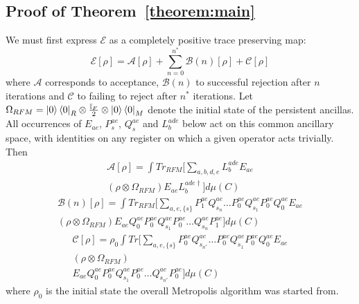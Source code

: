 \documentclass[aps,floatfix,10pt,amssymb,amsfont,amsmath,superscriptaddress,float,nofootinbib,longbibliography,nobalancelastpage,twocolumn]{revtex4-2}
\begin{document}
\subsection{Proof of Theorem~\ref{theorem:main}}
\label{section:proofmain}
We must first express $\mathcal{E}$ as a completely positive trace preserving map:
\begin{equation}
    \mathcal{E}[\rho] = \mathcal{A}[\rho] + \sum_{n=0}^{n^*} \mathcal{B}(n)[\rho] + \mathcal{C}[\rho]
\end{equation}
where $\mathcal{A}$ corresponds to acceptance, $\mathcal{B}(n)$ to successful rejection after $n$ iterations and $\mathcal{C}$ to failing to reject after $n^*$ iterations. Let $\Omega_{RFM} =\ket{0}\bra{0}_R\otimes \frac{\mathbb{I}_F}{2}\otimes\ket{0}\bra{0}_M$ denote the initial state of the persistent ancillas. All occurrences of $E_{ae}$, $P_s^{ae}$, $Q_s^{ae}$ and $L_b^{ade}$ below act on this common ancillary space, with identities on any register on which a given operator acts trivially. Then
\begin{multline}
    \mathcal{A}[\rho] = \int  Tr_{RFM}\bigg[\sum_{a,b,d,e}L_b^{ade} E_{ae} \\( \rho\otimes \Omega_{RFM}) 
     E_{ae}L^{ade\dagger}_b\bigg]d\mu(C)
\end{multline}
\begin{multline}
    \mathcal{B}(n)[\rho] = \int Tr_{RFM}\bigg[\sum_{a,e,\{s\}}P^{ae}_1Q^{ae}_{s_n}\ldots P^{ae}_0Q^{ae}_{s_1}P^{ae}_0Q^{ae}_0E_{ae}\\ ( \rho\otimes \Omega_{RFM})E_{ae}Q^{ae}_0P^{ae}_0Q^{ae}_{s_1}P^{ae}_0\ldots Q^{ae}_{s_n}P^{ae}_1\bigg]d\mu(C)
\end{multline}
\begin{multline}
    \mathcal{C}[\rho] = \rho_0 \int Tr\bigg[\sum_{a,e,\{s\}}P^{ae}_0Q^{ae}_{s_{n^*}}\ldots P^{ae}_0Q^{ae}_{s_1}P^{ae}_0Q^{ae}_0E_{ae}\\ ( \rho\otimes \Omega_{RFM})\\E_{ae}Q^{ae}_0P^{ae}_0Q^{ae}_{s_1}P^{ae}_0\ldots Q^{ae}_{s_{n^*}}P^{ae}_0\bigg]d\mu(C) 
\end{multline}
where $\rho_0$ is the initial state the overall Metropolis algorithm was started from. 

\end{document}

